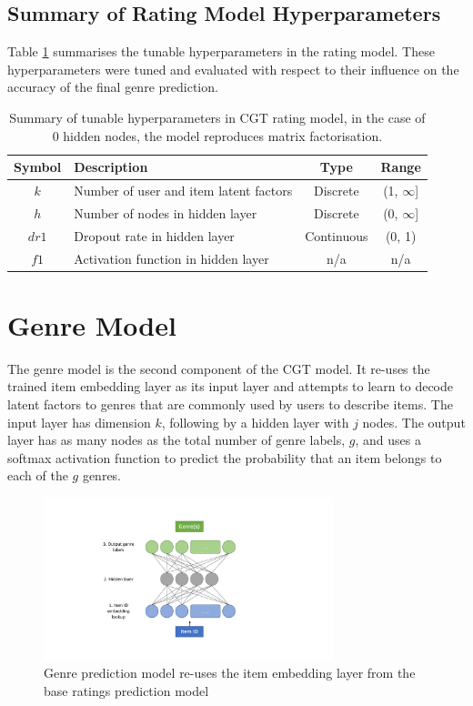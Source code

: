 \subsection{Summary of Rating Model Hyperparameters}
Table \ref{tab:rating-hparams} summarises the tunable hyperparameters in the rating model. These hyperparameters were tuned and evaluated with respect to their influence on the accuracy of the final genre prediction.
\begin{table}[H]
\centering
\begin{tabular}{c | p{3.5cm} | c | c}
\toprule
\textbf{Symbol} & \textbf{Description} & \textbf{Type} & \textbf{Range} \\
\midrule
$k$ & Number of user and item latent factors & Discrete & (1, $\infty$] \\
\midrule
$h$ & Number of nodes in hidden layer & Discrete & (0, $\infty$] \\
\midrule
$dr1$ & Dropout rate in hidden layer & Continuous & (0, 1) \\
\midrule
$f1$ & Activation function in hidden layer & n/a & n/a \\
\bottomrule
\end{tabular}
\caption[Rating model hyperparameters]{Summary of tunable hyperparameters in CGT rating model, in the case of 0 hidden nodes, the model reproduces matrix factorisation.}
\label{tab:rating-hparams}
\end{table}

\section{Genre Model}
The genre model is the second component of the CGT model. It re-uses the trained item embedding layer as its input layer and attempts to learn to decode latent factors to genres that are commonly used by users to describe items. The input layer has dimension $k$, following by a hidden layer with $j$ nodes. The output layer has as many nodes as the total number of genre labels, $g$, and uses a softmax activation function to predict the probability that an item belongs to each of the $g$ genres. 

\begin{figure}[H]
\centering
\includegraphics[width=0.75\textwidth]{Figures/4_genre-model.pdf}
\decoRule
\caption[Genre prediction model]{Genre prediction model re-uses the item embedding layer from the base ratings prediction model}
\label{fig:4_genre-prediction-architecture}
\end{figure}


